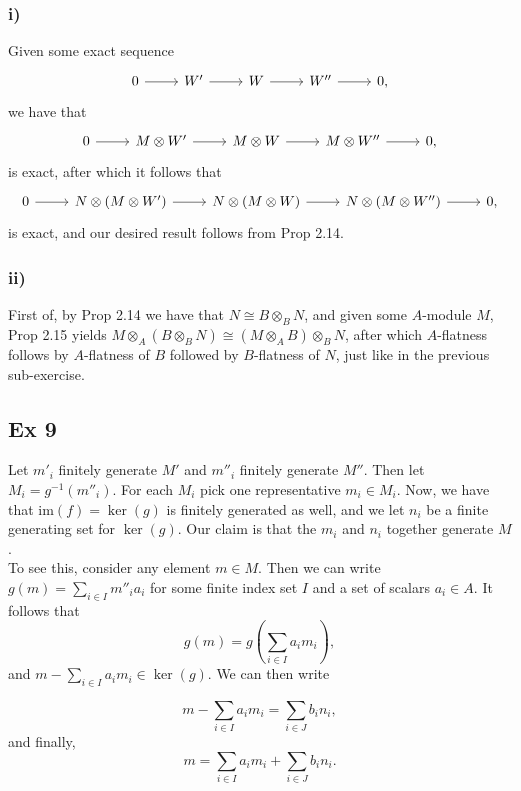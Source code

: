 \documentclass{article}
\theoremstyle{definition}
\newcommand{\im}{\text{im}}
\begin{document}
\subsubsection*{i)}
Given some exact sequence
\[
\begin{tikzcd}
	0 \arrow{r} &
	W' \arrow{r} &
	W \arrow{r} &
	W'' \arrow{r} &
	0,
\end{tikzcd}
\] 
we have that 
\[
\begin{tikzcd}
	0 \arrow{r} &
	M \otimes W' \arrow{r} &
	M \otimes W \arrow{r} &
	M \otimes W'' \arrow{r} &
	0,
\end{tikzcd}
\] 
is exact, after which it follows that 
\[
\begin{tikzcd}
	0 \arrow{r} &
	N \otimes (M \otimes W') \arrow{r} &
	N \otimes (M \otimes W) \arrow{r} &
	N \otimes (M \otimes W'') \arrow{r} &
	0,
\end{tikzcd}
\] 
is exact, and our desired result follows from Prop 2.14.
\subsubsection*{ii)}
First of, by Prop 2.14 we have that $N \cong B \otimes_B N$, and given some
$A$-module $M$, Prop 2.15 yields $M \otimes_A (B \otimes_B N) \cong (M
\otimes_A B) \otimes_B N$, after which $A$-flatness follows by $A$-flatness of
$B$ followed by $B$-flatness of $N$, just like in the previous sub-exercise.

\subsection*{Ex 9}

Let $m'_i$ finitely generate $M'$ and $m''_i$ finitely generate $M''$. Then let
$M_i = g^{-1}(m''_i)$. For each $M_i$ pick one representative $m_i \in M_i$.
Now, we have that $\im(f) = \ker(g)$ is finitely generated as well, and we let
$n_i$ be a finite generating set for $\ker(g)$. Our claim is that the $m_i$ and
$n_i$ together generate $M$. \\

To see this, consider any element $m \in M$. Then we can write $g(m) = \sum_{i
\in I} m''_i a_i$ for some finite index set $I$ and a set of scalars $a_i \in
A$. It follows that 
\[
g(m) = g\left(\sum_{i \in I} a_i m_i\right),
\] 
and $m - \sum_{i \in I} a_i m_i \in \ker(g)$. We can then write

\[
	m - \sum_{i \in I} a_i m_i = \sum_{i \in J} b_i n_i,
\] 
and finally,
\[
	m = \sum_{i \in I} a_i m_i + \sum_{i \in J} b_i n_i.
\] 
\end{document}
